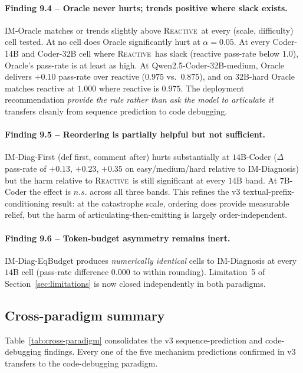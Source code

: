 \documentclass[11pt]{article}
\newcommand{\reactive}{\textsc{Reactive}}
\begin{document}
\paragraph{Finding 9.4 -- Oracle never hurts; trends positive
where slack exists.}  IM-Oracle matches or trends slightly
above \reactive\ at every (scale, difficulty) cell tested.  At
no cell does Oracle significantly hurt at $\alpha = 0.05$.  At
every Coder-14B and Coder-32B cell where \reactive\ has slack
(reactive pass-rate below $1.0$), Oracle's pass-rate is at
least as high.  At Qwen2.5-Coder-32B-medium, Oracle delivers
$+0.10$ pass-rate over reactive ($0.975$ vs.\ $0.875$), and on
$32$B-hard Oracle matches reactive at $1.000$ where reactive
is $0.975$.  The deployment recommendation \emph{provide the
rule rather than ask the model to articulate it} transfers
cleanly from sequence prediction to code debugging.

\paragraph{Finding 9.5 -- Reordering is partially helpful but
not sufficient.}  IM-Diag-First (def first, comment after)
hurts substantially at $14$B-Coder ($\Delta$ pass-rate of
$+0.13$, $+0.23$, $+0.35$ on easy/medium/hard relative to
IM-Diagnosis) but the harm relative to \reactive\ is still
significant at every $14$B band.  At $7$B-Coder the effect is
$n.s.$ across all three bands.  This refines the v3
textual-prefix-conditioning result: at the catastrophe scale,
ordering does provide measurable relief, but the harm of
articulating-then-emitting is largely order-independent.

\paragraph{Finding 9.6 -- Token-budget asymmetry remains inert.}
IM-Diag-EqBudget produces \emph{numerically identical} cells to
IM-Diagnosis at every $14$B cell (pass-rate difference $0.000$
to within rounding).  Limitation~5 of
Section~\ref{sec:limitations} is now closed independently in
both paradigms.

\subsection{Cross-paradigm summary}
\label{sec:cross-paradigm}

Table~\ref{tab:cross-paradigm} consolidates the v3 sequence-prediction
and code-debugging findings.  Every one of the five mechanism
predictions confirmed in v3 transfers to the code-debugging
paradigm.
\end{document}
